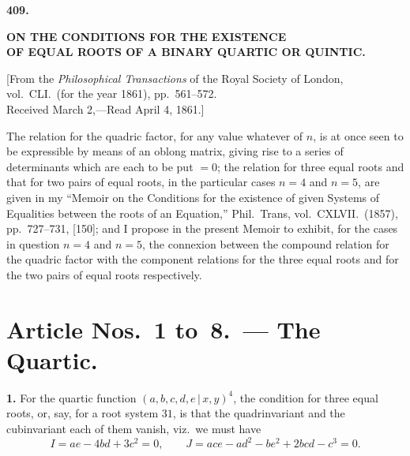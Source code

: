 \documentclass[11pt,a4paper]{article}
\begin{document}
\setcounter{page}{301}


\begin{center}
{\large\textbf{409.}}
\end{center}

\begin{center}
{\Large\textbf{ON THE CONDITIONS FOR THE EXISTENCE}}\\[4pt]
{\Large\textbf{OF EQUAL ROOTS OF A BINARY QUARTIC OR QUINTIC.}}
\end{center}

\begin{center}
[From the \textit{Philosophical Transactions} of the Royal Society of London,\\
vol.\ CLI.\ (for the year 1861), pp.~561--572.\\
Received March 2,---Read April 4, 1861.]
\end{center}

The relation for the quadric factor, for any value whatever of $n$, is at once seen to be expressible by means of an oblong matrix, giving rise to a series of determinants which are each to be put $=0$; the relation for three equal roots and that for two pairs of equal roots, in the particular cases $n=4$ and $n=5$, are given in my ``Memoir on the Conditions for the existence of given Systems of Equalities between the roots of an Equation,'' Phil.\ Trans, vol.\ CXLVII.\ (1857), pp.~727--731, [150]; and I propose in the present Memoir to exhibit, for the cases in question $n=4$ and $n=5$, the connexion between the compound relation for the quadric factor with the component relations for the three equal roots and for the two pairs of equal roots respectively.

\section*{Article Nos.~1 to~8.\ --- The Quartic.}

\textbf{1.} For the quartic function $(a,b,c,d,e\,\vert\,x,y)^4$, the condition for three equal roots, or, say, for a root system $31$, is that the quadrinvariant and the cubinvariant each of them vanish, viz.\ we must have
\[
I = ae - 4bd + 3c^2 = 0, \qquad
J = ace - ad^2 - be^2 + 2bcd - c^3 = 0.
\]
\end{document}
